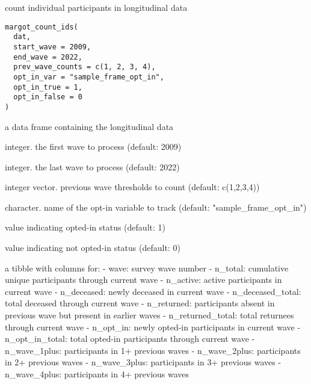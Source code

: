 \documentclass[a4paper]{book}
\begin{document}
%
\begin{Description}
count individual participants in longitudinal data
\end{Description}
%
\begin{Usage}
\begin{verbatim}
margot_count_ids(
  dat,
  start_wave = 2009,
  end_wave = 2022,
  prev_wave_counts = c(1, 2, 3, 4),
  opt_in_var = "sample_frame_opt_in",
  opt_in_true = 1,
  opt_in_false = 0
)
\end{verbatim}
\end{Usage}
%
\begin{Arguments}
\begin{ldescription}
\item[\code{dat}] a data frame containing the longitudinal data

\item[\code{start\_wave}] integer. the first wave to process (default: 2009)

\item[\code{end\_wave}] integer. the last wave to process (default: 2022)

\item[\code{prev\_wave\_counts}] integer vector. previous wave thresholds to count (default: c(1,2,3,4))

\item[\code{opt\_in\_var}] character. name of the opt-in variable to track (default: "sample\_frame\_opt\_in")

\item[\code{opt\_in\_true}] value indicating opted-in status (default: 1)

\item[\code{opt\_in\_false}] value indicating not opted-in status (default: 0)
\end{ldescription}
\end{Arguments}
%
\begin{Value}
a tibble with columns for:
- wave: survey wave number
- n\_total: cumulative unique participants through current wave
- n\_active: active participants in current wave
- n\_deceased: newly deceased in current wave
- n\_deceased\_total: total deceased through current wave
- n\_returned: participants absent in previous wave but present in earlier waves
- n\_returned\_total: total returnees through current wave
- n\_opt\_in: newly opted-in participants in current wave
- n\_opt\_in\_total: total opted-in participants through current wave
- n\_wave\_1plus: participants in 1+ previous waves
- n\_wave\_2plus: participants in 2+ previous waves
- n\_wave\_3plus: participants in 3+ previous waves
- n\_wave\_4plus: participants in 4+ previous waves
\end{Value}
\end{document}
